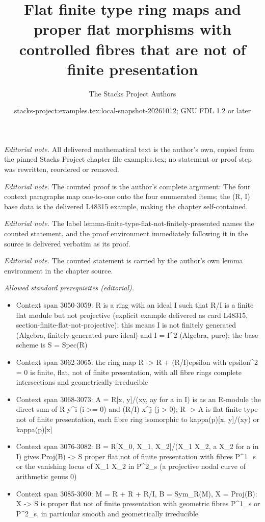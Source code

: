 \documentclass[10pt,a4paper]{amsart}
\title{Flat finite type ring maps and proper flat morphisms with controlled fibres that are not of finite presentation}
\author{The Stacks Project Authors}
\date{stacks-project:examples.tex:local-snapshot-20261012; GNU FDL 1.2 or later}
\theoremstyle{plain}
\theoremstyle{definition}
\theoremstyle{remark}
\numberwithin{equation}{subsection}
\begin{document}
\maketitle
\noindent\textit{Editorial note.} All delivered mathematical text is the author's own, copied from the pinned Stacks Project chapter file examples.tex; no statement or proof step was rewritten, reordered or removed.\par\medskip
\noindent\textit{Editorial note.} The counted proof is the author's complete argument: The four context paragraphs map one-to-one onto the four enumerated items; the (R, I) base data is the delivered L48315 example, making the chapter self-contained.\par\medskip
\noindent\textit{Editorial note.} The label lemma-finite-type-flat-not-finitely-presented names the counted statement, and the proof environment immediately following it in the source is delivered verbatim as its proof.\par\medskip
\noindent\textit{Editorial note.} The counted statement is carried by the author's own lemma environment in the chapter source.\par\medskip
\noindent\textit{Allowed standard prerequisites (editorial).}\begin{itemize}
\item Context span 3050-3059: R is a ring with an ideal I such that R/I is a finite flat module but not projective (explicit example delivered as card L48315, section-finite-flat-not-projective); this means I is not finitely generated (Algebra, finitely-generated-pure-ideal) and I = I\textasciicircum{}2 (Algebra, pure); the base scheme is S = Spec(R)
\item Context span 3062-3065: the ring map R -> R + (R/I)epsilon with epsilon\textasciicircum{}2 = 0 is finite, flat, not of finite presentation, with all fibre rings complete intersections and geometrically irreducible
\item Context span 3068-3073: A = R[x, y]/(xy, ay for a in I) is as an R-module the direct sum of R y\textasciicircum{}i (i >= 0) and (R/I) x\textasciicircum{}j (j > 0); R -> A is flat finite type not of finite presentation, each fibre ring isomorphic to kappa(p)[x, y]/(xy) or kappa(p)[x]
\item Context span 3076-3082: B = R[X\_0, X\_1, X\_2]/(X\_1 X\_2, a X\_2 for a in I) gives Proj(B) -> S proper flat not of finite presentation with fibres P\textasciicircum{}1\_s or the vanishing locus of X\_1 X\_2 in P\textasciicircum{}2\_s (a projective nodal curve of arithmetic genus 0)
\item Context span 3085-3090: M = R + R + R/I, B = Sym\_R(M), X = Proj(B): X -> S is proper flat not of finite presentation with geometric fibres P\textasciicircum{}1\_s or P\textasciicircum{}2\_s, in particular smooth and geometrically irreducible
\end{itemize}\medskip
\end{document}
